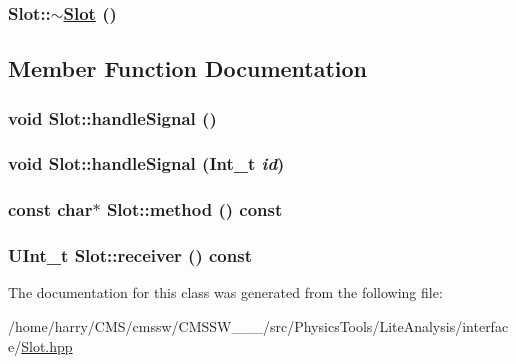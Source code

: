\hypertarget{classSlot_a2}{
\subsubsection[$\sim$Slot]{\setlength{\rightskip}{0pt plus 5cm}Slot::$\sim$\hyperlink{classSlot}{Slot} ()}}
\label{classSlot_a2}




\subsection{Member Function Documentation}
\hypertarget{classSlot_a4}{
\subsubsection[handleSignal]{\setlength{\rightskip}{0pt plus 5cm}void Slot::handle\-Signal ()}}
\label{classSlot_a4}


\hypertarget{classSlot_a3}{
\subsubsection[handleSignal]{\setlength{\rightskip}{0pt plus 5cm}void Slot::handle\-Signal (Int\_\-t {\em id})}}
\label{classSlot_a3}


\hypertarget{classSlot_a6}{
\subsubsection[method]{\setlength{\rightskip}{0pt plus 5cm}const char$\ast$ Slot::method () const}}
\label{classSlot_a6}


\hypertarget{classSlot_a5}{
\subsubsection[receiver]{\setlength{\rightskip}{0pt plus 5cm}UInt\_\-t Slot::receiver () const}}
\label{classSlot_a5}




The documentation for this class was generated from the following file:\begin{CompactItemize}
\item 
/home/harry/CMS/cmssw/CMSSW\_\_\_/src/Physics\-Tools/Lite\-Analysis/interface/\hyperlink{Slot_8hpp}{Slot.hpp}\end{CompactItemize}
